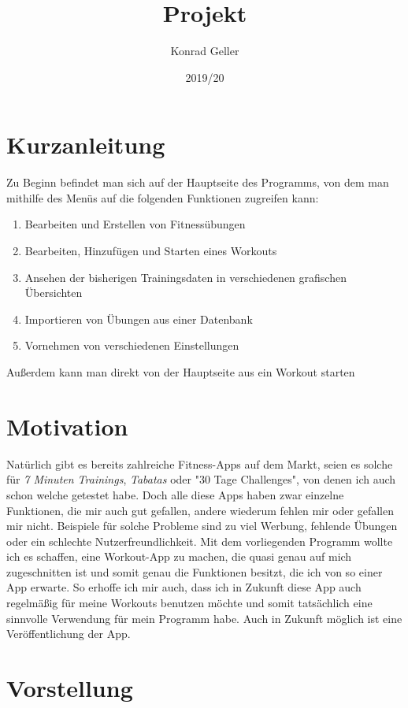 \documentclass[
	fontsize=11pt,
	]{article}
\title{Projekt}
\author{Konrad Geller}
\date{2019/20}
\begin{document}
\begin{titlepage}
	\maketitle
\end{titlepage}
\setcounter{page}{1}
\tableofcontents
\newpage

\section{Kurzanleitung}
Zu Beginn befindet man sich auf der Hauptseite des Programms, von dem man mithilfe des Menüs auf die folgenden Funktionen zugreifen kann:
\begin{enumerate}
	\item Bearbeiten und Erstellen von Fitnessübungen
	\item Bearbeiten, Hinzufügen und Starten eines Workouts
	\item Ansehen der bisherigen Trainingsdaten in verschiedenen grafischen Übersichten
	\item Importieren von Übungen aus einer Datenbank
	\item Vornehmen von verschiedenen Einstellungen
\end{enumerate}
Außerdem kann man direkt von der Hauptseite aus ein Workout starten
\section{Motivation}
Natürlich gibt es bereits zahlreiche Fitness-Apps auf dem Markt, seien es solche für \textit{7 Minuten Trainings}, \textit{Tabatas} oder "30 Tage Challenges", von denen ich auch schon welche getestet habe. Doch alle diese Apps haben zwar einzelne Funktionen, die mir auch gut gefallen, andere wiederum fehlen mir oder gefallen mir nicht. Beispiele für solche Probleme sind zu viel Werbung, fehlende Übungen oder ein schlechte Nutzerfreundlichkeit. Mit dem vorliegenden Programm wollte ich es schaffen, eine Workout-App zu machen, die quasi genau auf mich zugeschnitten ist und somit genau die Funktionen besitzt, die ich von so einer App erwarte. So erhoffe ich mir auch, dass ich in Zukunft diese App auch regelmäßig für meine Workouts benutzen möchte und somit tatsächlich eine sinnvolle Verwendung für mein Programm habe. Auch in Zukunft möglich ist eine Veröffentlichung der App.
\section{Vorstellung}
\end{document}
